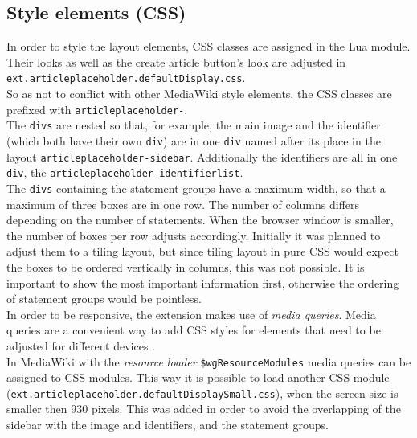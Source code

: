 \subsection{Style elements (CSS)}

In order to style the layout elements, CSS classes are assigned in the Lua module. Their looks as well as the create article button's look are adjusted in \texttt{ext.articleplaceholder.defaultDisplay.css}. \\
So as not to conflict with other MediaWiki style elements, the CSS classes are prefixed with \texttt{\justify articleplaceholder-}. \\
The \texttt{\justify divs} are nested so that, for example, the main image and the identifier (which both have their own \texttt{div}) are in one \texttt{div} named after its place in the layout \texttt{\justify articleplaceholder-sidebar}. Additionally the identifiers are all in one \texttt{div}, the \texttt{\justify articleplaceholder-identifierlist}. \\
The \texttt{divs} containing the statement groups have a maximum width, so that a maximum of three boxes are in one row. The number of columns differs depending on the number of statements. When the browser window is smaller, the number of boxes per row adjusts accordingly. Initially it was planned to adjust them to a tiling layout, but since tiling layout in pure CSS would expect the boxes to be ordered vertically in columns, this was not possible.  It is important to show the most important information first, otherwise the ordering of statement groups would be pointless. \\
In order to be responsive, the extension makes use of \textit{media queries}. Media queries are a convenient way to add CSS styles for elements that need to be adjusted for different devices \citep[43]{mediaquery}.\\
In MediaWiki with the \textit{resource loader} \texttt{\justify \$wgResourceModules} media queries can be assigned to CSS modules. This way it is possible to load another CSS module (\texttt{\justify ext.articleplaceholder.defaultDisplaySmall.css}), when the screen size is smaller then 930 pixels. This was added in order to avoid the overlapping of the sidebar with the image and identifiers, and the statement groups.